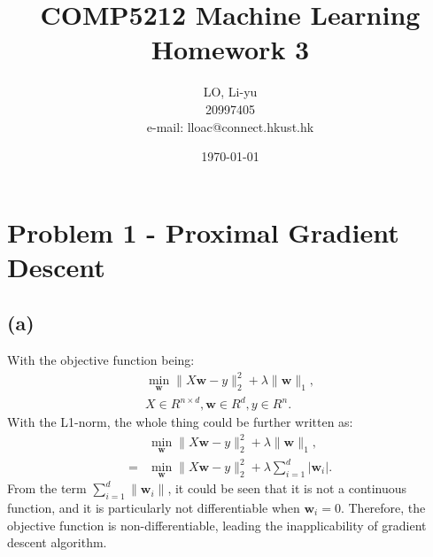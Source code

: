 \documentclass[a4paper,12pt]{article}
\begin{document}
%
   \title{\textbf{COMP5212 Machine Learning} \\  
   Homework 3}
   
   \author{LO, Li-yu \\ 20997405 \\ e-mail: lloac@connect.hkust.hk}
   \date{\today}
   \maketitle

\section*{Problem 1 - Proximal Gradient Descent}
\subsection*{(a)}
With the objective function being:
\begin{align*}
   \min_{\textbf{w}} \|X\textbf{w} - y\|^2_2 + \lambda \|\textbf{w}\|_1, \\ 
   X \in R^{n \times d}, \textbf{w} \in R^d, y \in R^n. 
\end{align*}
With the L1-norm, the whole thing could be further written as:
\begin{align*}
   &\min_{\textbf{w}} \|X\textbf{w} - y\|^2_2 + \lambda \|\textbf{w}\|_1, \\ 
   =&\min_{\textbf{w}} \|X\textbf{w} - y\|^2_2 + \lambda \sum_{i=1}^{d} |\textbf{w}_i|. 
\end{align*}
From the term $\sum_{i=1}^{d} \|\textbf{w}_i\|$, it could be seen that it is not a
continuous function, and it is particularly not differentiable when $\textbf{w}_i = 0$. 
Therefore, the objective function is non-differentiable, leading the inapplicability of 
gradient descent algorithm.
\end{document}
